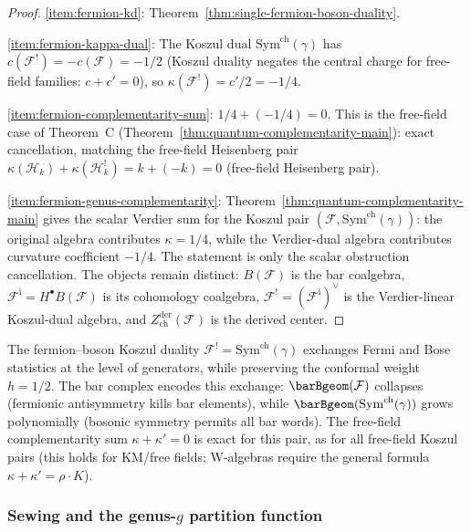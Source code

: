\begin{proof}
\eqref{item:fermion-kd}:
Theorem~\ref{thm:single-fermion-boson-duality}.

\eqref{item:fermion-kappa-dual}:
The Koszul dual $\mathrm{Sym}^{\mathrm{ch}}(\gamma)$ has
$c(\mathcal{F}^!) = -c(\mathcal{F}) = -1/2$
(Koszul duality negates the central charge for free-field families:
$c + c' = 0$), so
$\kappa(\mathcal{F}^!) = c'/2 = -1/4$.

\eqref{item:fermion-complementarity-sum}:
$1/4 + (-1/4) = 0$. This is the free-field case of
Theorem~C \textup{(}Theorem~\ref{thm:quantum-complementarity-main}\textup{)}:
exact cancellation, matching the free-field Heisenberg pair
$\kappa(\mathcal{H}_k) + \kappa(\mathcal{H}_k^!) = k + (-k) = 0$ \textup{(}free-field Heisenberg pair\textup{)}.

\eqref{item:fermion-genus-complementarity}:
Theorem~\ref{thm:quantum-complementarity-main} gives the scalar
Verdier sum for the Koszul pair
$(\mathcal{F}, \mathrm{Sym}^{\mathrm{ch}}(\gamma))$:
the original algebra contributes $\kappa=1/4$, while the
Verdier-dual algebra contributes curvature coefficient $-1/4$.
The statement is only the scalar obstruction cancellation. The
objects remain distinct: $B(\mathcal F)$ is the bar coalgebra,
$\mathcal F^{\mathrm i}=H^\bullet B(\mathcal F)$ is its cohomology
coalgebra, $\mathcal F^!=(\mathcal F^{\mathrm i})^\vee$ is the
Verdier-linear Koszul-dual algebra, and
$Z_{\mathrm{ch}}^{\mathrm{der}}(\mathcal F)$ is the derived center.
\end{proof}

\begin{remark}
\label{rem:fermion-statistics-exchange}
The fermion--boson Koszul duality $\mathcal{F}^! = \mathrm{Sym}^{\mathrm{ch}}(\gamma)$ exchanges
Fermi and Bose statistics at the level of generators, while preserving
the conformal weight $h = 1/2$. The bar complex encodes this exchange:
$\barBgeom(\mathcal{F})$ collapses (fermionic antisymmetry kills bar
elements), while $\barBgeom(\mathrm{Sym}^{\mathrm{ch}}(\gamma))$ grows
polynomially (bosonic symmetry permits all bar words). The
free-field complementarity sum $\kappa + \kappa' = 0$ is exact for this pair, as
for all free-field Koszul pairs \textup{(}this holds for
KM\slash free fields; W-algebras require the general formula
$\kappa + \kappa' = \rho \cdot K$\textup{)}.
\end{remark}

\subsubsection{Sewing and the genus-$g$ partition function}
\label{sec:fermion-sewing}%
%
%

